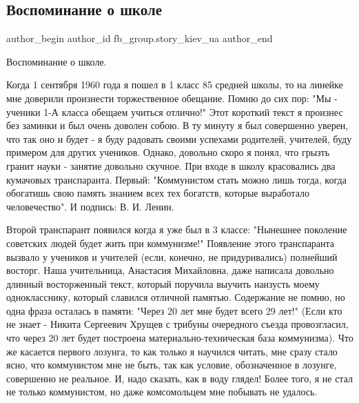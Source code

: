  
 
 
 
 
 
\subsection{Воспоминание о школе}
\label{sec:09_08_2021.fb.fb_group.story_kiev_ua.1.shkola_pamjat}
 
\ifcmt
 author_begin
   author_id fb_group.story_kiev_ua
 author_end
\fi

Воспоминание о школе.

Когда 1 сентября 1960 года я пошел  в 1 класс 85 средней школы,  то на  линейке
мне доверили произнести  торжественное обещание. Помню до сих пор: "Мы -
ученики 1-А класса обещаем учиться отлично!" Этот короткий текст я произнес без
заминки и был очень доволен собою.  В ту минуту я был совершенно уверен, что
так оно и будет - я буду радовать своими успехами родителей, учителей, буду
примером для других учеников. Однако, довольно скоро я понял, что грызть гранит
науки - занятие довольно скучное. При входе в школу красовались два кумачовых
транспаранта.  Первый: "Коммунистом стать можно лишь тогда, когда обогатишь
свою память знанием всех тех богатств, которые выработало человечество". И
подпись: В. И. Ленин.

Второй транспарант появился когда я уже был в 3 классе: "Нынешнее поколение
советских людей будет жить при коммунизме!"  Появление этого транспаранта
вызвало у учеников и учителей (если, конечно, не придуривались) полнейший
восторг. Наша учительница, Анастасия Михайловна, даже написала довольно
длинный восторженный текст, который поручила выучить наизусть моему
однокласснику, который славился отличной памятью. Содержание не помню, но одна
фраза осталась в памяти: "Через 20 лет мне будет всего 29 лет!" (Если кто не
знает - Никита Сергеевич Хрущев с трибуны очередного съезда провозгласил, что
через 20 лет будет построена материально-техническая база коммунизма). Что же
касается первого лозунга, то как только я научился читать, мне сразу стало
ясно, что коммунистом мне не быть, так как условие, обозначенное в лозунге,
совершенно не реальное. И, надо сказать, как в воду глядел! Более того, я не
стал не только коммунистом, но даже комсомольцем мне побывать не удалось.

